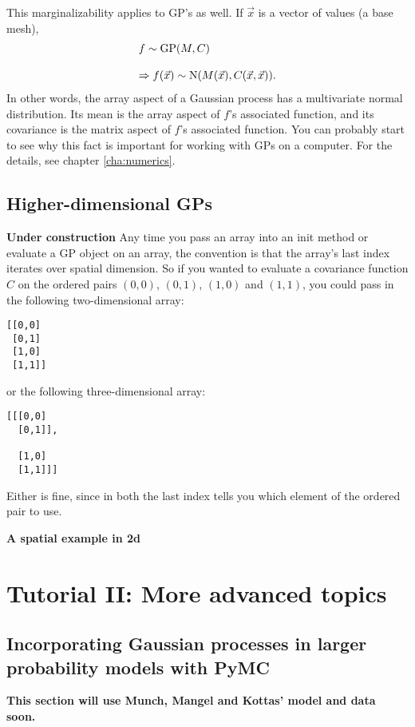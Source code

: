 \documentclass{manual}
\begin{document}
This marginalizability applies to GP's as well. If $\vec x$ is a vector of values (a base mesh),
\begin{equation}
	\begin{array}{l}
		f\sim\textup{GP}(M, C)\\\\
		\Rightarrow f(\vec x) \sim\textup N(M(\vec x), C(\vec x,\vec x)).
	\end{array}
\end{equation}
In other words, the array aspect of a Gaussian process  has a multivariate normal distribution. Its mean is the array aspect of $f$'s associated  function, and its covariance is the matrix aspect of $f$'s associated  function. You can probably start to see why this fact is important for working with GPs on a computer. For the details, see chapter \ref{cha:numerics}. 

\section{Higher-dimensional GPs}\label{sec:highdim} 
\textbf{Under construction}
Any time you pass an array into an init method or evaluate a GP object on an array, the convention is that the array's last index iterates over spatial dimension. So if you wanted to evaluate a covariance function $C$ on the ordered pairs $(0,0)$, $(0,1)$, $(1,0)$ and $(1,1)$, you could pass in the following two-dimensional array:
\begin{verbatim}
[[0,0]
 [0,1]
 [1,0]
 [1,1]]
\end{verbatim}
or the following three-dimensional array:
\begin{verbatim}
[[[0,0]
  [0,1]],

  [1,0]
  [1,1]]]
\end{verbatim}
Either is fine, since in both the last index tells you which element of the ordered pair to use.

\textbf{A spatial example in 2d}



\chapter{Tutorial II: More advanced topics}\label{cha:adv} %

\section{Incorporating Gaussian processes in larger probability models with PyMC}\label{sec:PyMC} 
\textbf{This section will use Munch, Mangel and Kottas' model and data soon.}
\end{document}
